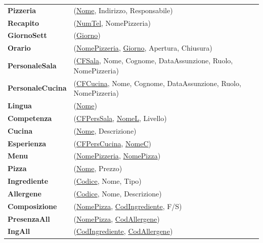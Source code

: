 \documentclass{article}
\begin{document}
\begin{tabular}{ll}
	\textbf{Pizzeria} & (\underline{Nome}, Indirizzo, Responsabile) \\
	
	\textbf{Recapito} & (\underline{NumTel}, NomePizzeria) \\
	
	\textbf{GiornoSett} & (\underline{Giorno}) \\
	
	\textbf{Orario} & (\underline{NomePizzeria}, \underline{Giorno}, Apertura, Chiusura) \\
	
	\textbf{PersonaleSala} & (\underline{CFSala}, Nome, Cognome, DataAssunzione, Ruolo, NomePizzeria) \\
	
	\textbf{PersonaleCucina} & (\underline{CFCucina}, Nome, Cognome, DataAssunzione, Ruolo, NomePizzeria) \\
	
	\textbf{Lingua} & (\underline{Nome}) \\
	
	\textbf{Competenza} & (\underline{CFPersSala}, \underline{NomeL}, Livello) \\
	
	\textbf{Cucina} & (\underline{Nome}, Descrizione) \\
	
	\textbf{Esperienza} & (\underline{CFPersCucina}, \underline{NomeC}) \\
	
	\textbf{Menu} & (\underline{NomePizzeria}, \underline{NomePizza}) \\
	
	\textbf{Pizza} & (\underline{Nome}, Prezzo) \\
	
	\textbf{Ingrediente} & (\underline{Codice}, Nome, Tipo) \\
	
	\textbf{Allergene} & (\underline{Codice}, Nome, Descrizione) \\
	
	\textbf{Composizione} & (\underline{NomePizza}, \underline{CodIngrediente}, F/S) \\
	
	\textbf{PresenzaAll} & (\underline{NomePizza}, \underline{CodAllergene}) \\
	
	\textbf{IngAll} & (\underline{CodIngrediente}, \underline{CodAllergene}) \\
\end{tabular}
\end{document}
